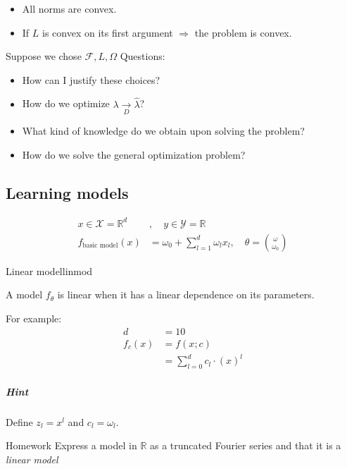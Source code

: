 \begin{itemize}
	\item All norms are convex.
	\item If $L$ is convex on its first argument $\Rightarrow$ the problem is convex.
\end{itemize}

Suppose we chose $\mathcal{F}, L, \Omega$ Questions:

\begin{itemize}
	\item How can I justify these choices?
	\item How do we optimize $\lambda \xrightarrow[D]{} \hat\lambda$?
	\item What kind of knowledge do we obtain upon solving the problem?
	\item How do we solve the general optimization problem?
\end{itemize}

\subsection{Learning models} %

\begin{align*}
	x \in \mathcal{X} = \mathds{R}^d & , \quad y \in \mathcal{Y} = \mathds{R}                                            \\
	f_{\text{basic model}}(x)        & = \omega_0 + \sum_{l = 1}^d \omega_l x_l, \quad \theta = \binom{\omega}{\omega_0}
\end{align*}

\begin{definition}{Linear model}{linmod}

A model $f_\theta$ is linear when it has a linear dependence on its parameters.

\tcblower
For example:
\begin{align*}
	d      & = 10                           \\
	f_c(x) & = f(x;c)                       \\
	       & = \sum_{l=0}^d c_l \cdot (x)^l
\end{align*}
\end{definition}

\subparagraph{Hint} Define $z_l = x^l$ and $c_l = \omega_l$.

\begin{exercise}{Homework}{}
Express a model in $\mathds{R}$ as a truncated Fourier series and
that it is a \emph{linear model}
\end{exercise}

